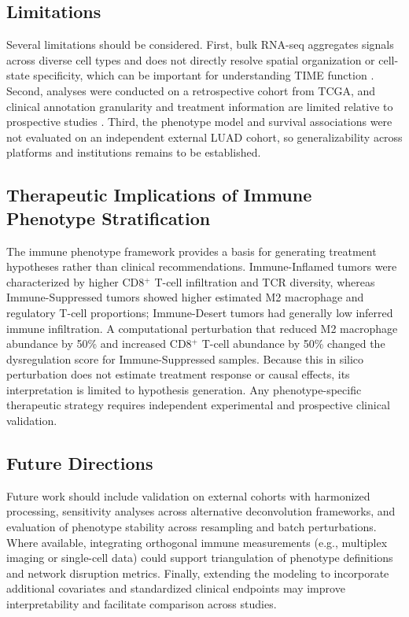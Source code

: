\documentclass[conference]{IEEEtran}
\begin{document}
\subsection{Limitations}
Several limitations should be considered.
First, bulk RNA-seq aggregates signals across diverse cell types and does not directly resolve spatial organization or cell-state specificity, which can be important for understanding TIME function \cite{Fridman2017,ChenMellman2017}.
Second, analyses were conducted on a retrospective cohort from TCGA, and clinical annotation granularity and treatment information are limited relative to prospective studies \cite{TCGA_LUAD_2014,Grossman2016GDC}.
Third, the phenotype model and survival associations were not evaluated on an independent external LUAD cohort, so generalizability across platforms and institutions remains to be established.


\subsection{Therapeutic Implications of Immune Phenotype Stratification}
The immune phenotype framework provides a basis for generating treatment hypotheses rather than clinical recommendations. Immune-Inflamed tumors were characterized by higher CD8$^+$ T-cell infiltration and TCR diversity, whereas Immune-Suppressed tumors showed higher estimated M2 macrophage and regulatory T-cell proportions; Immune-Desert tumors had generally low inferred immune infiltration. A computational perturbation that reduced M2 macrophage abundance by 50\% and increased CD8$^+$ T-cell abundance by 50\% changed the dysregulation score for Immune-Suppressed samples. Because this in silico perturbation does not estimate treatment response or causal effects, its interpretation is limited to hypothesis generation. Any phenotype-specific therapeutic strategy requires independent experimental and prospective clinical validation.

\subsection{Future Directions}
Future work should include validation on external cohorts with harmonized processing, sensitivity analyses across alternative deconvolution frameworks, and evaluation of phenotype stability across resampling and batch perturbations.
Where available, integrating orthogonal immune measurements (e.g., multiplex imaging or single-cell data) could support triangulation of phenotype definitions and network disruption metrics.
Finally, extending the modeling to incorporate additional covariates and standardized clinical endpoints may improve interpretability and facilitate comparison across studies.
\end{document}
